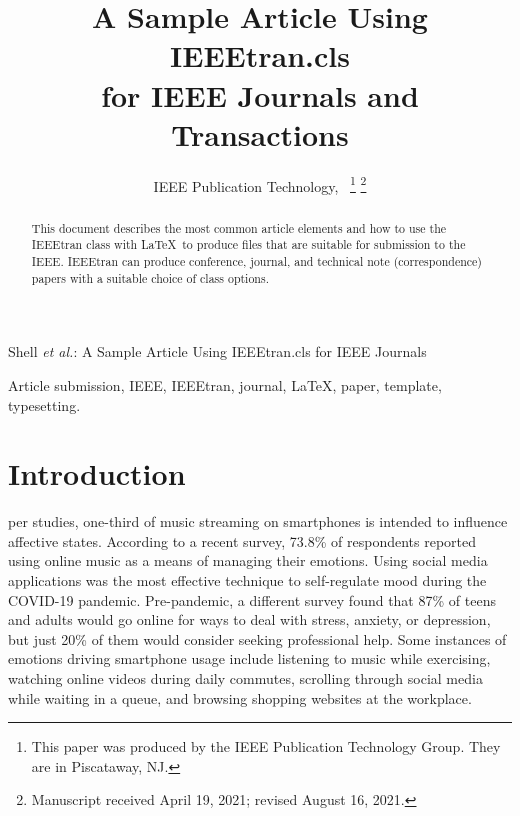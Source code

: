 \documentclass[lettersize,journal]{IEEEtran}
\begin{document}
\title{A Sample Article Using IEEEtran.cls\\ for IEEE Journals and Transactions}

\author{IEEE Publication Technology,~
\thanks{This paper was produced by the IEEE Publication Technology Group. They are in Piscataway, NJ.}%
\thanks{Manuscript received April 19, 2021; revised August 16, 2021.}}

%
{Shell \MakeLowercase{\textit{et al.}}: A Sample Article Using IEEEtran.cls for IEEE Journals}


\maketitle

\begin{abstract}
This document describes the most common article elements and how to use the IEEEtran class with \LaTeX \ to produce files that are suitable for submission to the IEEE.  IEEEtran can produce conference, journal, and technical note (correspondence) papers with a suitable choice of class options. 
\end{abstract}

\begin{IEEEkeywords}
Article submission, IEEE, IEEEtran, journal, \LaTeX, paper, template, typesetting.
\end{IEEEkeywords}

\section{Introduction}
 per studies, one-third of music streaming on smartphones is intended to influence affective states. According to a recent survey, 73.8\% of respondents reported using online music as a means of managing their emotions. Using social media applications was the most effective technique to self-regulate mood during the COVID-19 pandemic. Pre-pandemic, a different survey found that 87\% of teens and adults would go online for ways to deal with stress, anxiety, or depression, but just 20\% of them would consider seeking professional help. Some instances of emotions driving smartphone usage include listening to music while exercising, watching online videos during daily commutes, scrolling through social media while waiting in a queue, and browsing shopping websites at the workplace.
\end{document}
